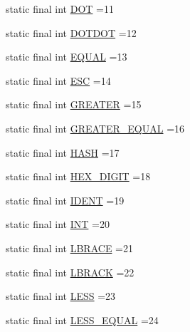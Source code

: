\begin{DoxyCompactItemize}
\item 
static final int \hyperlink{classorg_1_1tzi_1_1use_1_1parser_1_1soil_1_1_soil_lexer_a4c42c5bf6fbf6938c98172cd53fd5ff1}{D\-O\-T} =11
\item 
static final int \hyperlink{classorg_1_1tzi_1_1use_1_1parser_1_1soil_1_1_soil_lexer_a830aada37be54f2e2944898fd31ebabe}{D\-O\-T\-D\-O\-T} =12
\item 
static final int \hyperlink{classorg_1_1tzi_1_1use_1_1parser_1_1soil_1_1_soil_lexer_ae3e5fd084bd97fca12d8878025c7945b}{E\-Q\-U\-A\-L} =13
\item 
static final int \hyperlink{classorg_1_1tzi_1_1use_1_1parser_1_1soil_1_1_soil_lexer_a60ce0c8b0896c6798153432552feb3e3}{E\-S\-C} =14
\item 
static final int \hyperlink{classorg_1_1tzi_1_1use_1_1parser_1_1soil_1_1_soil_lexer_ad33a7e3459c53c5600e91538d0609ced}{G\-R\-E\-A\-T\-E\-R} =15
\item 
static final int \hyperlink{classorg_1_1tzi_1_1use_1_1parser_1_1soil_1_1_soil_lexer_ad867378f1ba3c5b11629f1f7f917fef4}{G\-R\-E\-A\-T\-E\-R\-\_\-\-E\-Q\-U\-A\-L} =16
\item 
static final int \hyperlink{classorg_1_1tzi_1_1use_1_1parser_1_1soil_1_1_soil_lexer_af5902e08572a7ca01680d184f4dee867}{H\-A\-S\-H} =17
\item 
static final int \hyperlink{classorg_1_1tzi_1_1use_1_1parser_1_1soil_1_1_soil_lexer_a4539b5c7a416bf74a6361394262b3467}{H\-E\-X\-\_\-\-D\-I\-G\-I\-T} =18
\item 
static final int \hyperlink{classorg_1_1tzi_1_1use_1_1parser_1_1soil_1_1_soil_lexer_a6d03f5d1151f8798e0f3d8d40fe79575}{I\-D\-E\-N\-T} =19
\item 
static final int \hyperlink{classorg_1_1tzi_1_1use_1_1parser_1_1soil_1_1_soil_lexer_ae9d425b1182703c77b2efbcc0a45ec2e}{I\-N\-T} =20
\item 
static final int \hyperlink{classorg_1_1tzi_1_1use_1_1parser_1_1soil_1_1_soil_lexer_ac95c4629e81847beaaea6df4a0b7999a}{L\-B\-R\-A\-C\-E} =21
\item 
static final int \hyperlink{classorg_1_1tzi_1_1use_1_1parser_1_1soil_1_1_soil_lexer_a2cadaad657bc8a27d97e440b33176af3}{L\-B\-R\-A\-C\-K} =22
\item 
static final int \hyperlink{classorg_1_1tzi_1_1use_1_1parser_1_1soil_1_1_soil_lexer_aa7d9a7d02c5441d52738a14dba764e04}{L\-E\-S\-S} =23
\item 
static final int \hyperlink{classorg_1_1tzi_1_1use_1_1parser_1_1soil_1_1_soil_lexer_a3481a95349c2df3edb578dd0dea4a7d4}{L\-E\-S\-S\-\_\-\-E\-Q\-U\-A\-L} =24

\end{DoxyCompactItemize}
